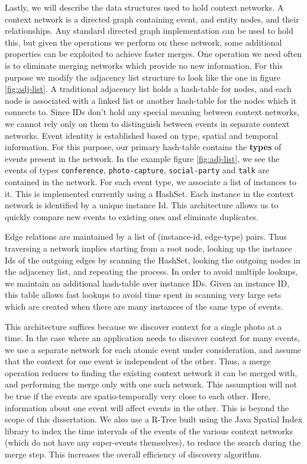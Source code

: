 Lastly, we will describe the data structures used to hold context networks. A context network is a directed graph containing event, and entity nodes, and their relationships. Any standard directed graph implementation can be used to hold this, but given the operations we perform on these network, some additional properties can be exploited to achieve faster merges. One operation we need often is to eliminate merging networks which provide no new information. For this purpose we modify the adjacency list structure to look like the one in figure \ref{fig:adj-list}. A traditional adjacency list holds a hash-table for nodes, and each node is associated with a linked list or another hash-table for the nodes which it connects to. Since IDs don't hold any special meaning between context networks, we cannot rely only on them to distinguish between events in separate context networks. Event identity is established based on type, spatial and temporal information. For this purpose, our primary hash-table contains the \textbf{types} of events present in the network. In the example figure \ref{fig:adj-list}, we see the events of types \texttt{conference}, \texttt{photo-capture}, \texttt{social-party} and \texttt{talk} are contained in the network. For each event type, we associate a list of instances to it. This is implemented currently using a HashSet. Each instance in the context network is identified by a unique instance Id. This architecture allows us to quickly compare new events to existing ones and eliminate duplicates. 

Edge relations are maintained by a list of (instance-id, edge-type) pairs. Thus traversing a network implies starting from a root node, looking up the instance Ids of the outgoing edges by scanning the HashSet, looking the outgoing nodes in the adjacency list, and repeating the process. In order to avoid multiple lookups, we maintain an additional hash-table over instance IDs. Given an instance ID, this table allows fast lookups to avoid time spent in scanning very large sets which are created when there are many instances of the same type of events.

This architecture suffices because we discover context for a single photo at a time. In the case where an application needs to discover context for many events, we use a separate network for each atomic event under consideration, and assume that the context for one event is independent of the other. Thus, a merge operation reduces to finding the existing context network it can be merged with, and performing the merge only with one such network. This assumption will not be true if the events are spatio-temporally very close to each other. Here, information about one event will affect events in the other. This is beyond the scope of this dissertation. We also use a R-Tree built using the Java Spatial Index library to index the time intervals of the events of the various context networks (which do not have any super-events themselves), to reduce the search during the merge step. This increases the overall efficiency of discovery algorithm.